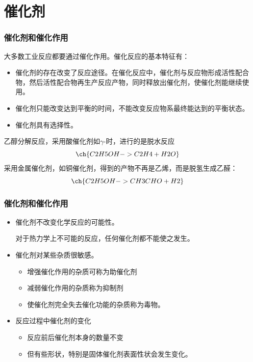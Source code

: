 \documentclass[dvipsnames, svgnames, x11names]{beamer}
\begin{document}
\section{催化剂}


\begin{frame}
    \frametitle{催化剂和催化作用}
    大多数工业反应都要通过催化作用。催化反应的基本特征有：
    \begin{itemize}
        \item[1] 催化剂的存在改变了反应途径。在催化反应中，催化剂与反应物形成活性配合物，然后活性配合物再生产反应产物，同时释放出催化剂，使催化剂能继续使用。
        \item[2] 催化剂只能改变达到平衡的时间，不能改变反应物系最终能达到的平衡状态。
        \item[3] 催化剂具有选择性。
    \end{itemize}
    \begin{blankblock}{}
        乙醇分解反应，采用酸催化剂如$\gamma$-时，进行的是脱水反应
        \[
            \ch{C2H5OH -> C2H4 + H2O}
        \]
        采用金属催化剂，如铜催化剂，得到的产物不再是乙烯，而是脱氢生成乙醛：
        \[
            \ch{C2H5OH -> CH3CHO + H2}
        \]
    \end{blankblock}
\end{frame}


\begin{frame}
    \frametitle{催化剂和催化作用}
    \begin{itemize}
        \item[4] 催化剂不改变化学反应的可能性。
        
        对于热力学上不可能的反应，任何催化剂都不能使之发生。
        \item[5] 催化剂对某些杂质很敏感。
            \begin{itemize}
              \item 增强催化作用的杂质可称为助催化剂
              \item 减弱催化作用的杂质称为抑制剂
              \item 使催化剂完全失去催化功能的杂质称为毒物。
            \end{itemize}
        \item[6] 反应过程中催化剂的变化
            \begin{itemize}
              \item 反应前后催化剂本身的数量不变
              \item 但有些形状，特别是固体催化剂表面性状会发生变化。
            \end{itemize}
    \end{itemize}
\end{frame}
\end{document}
